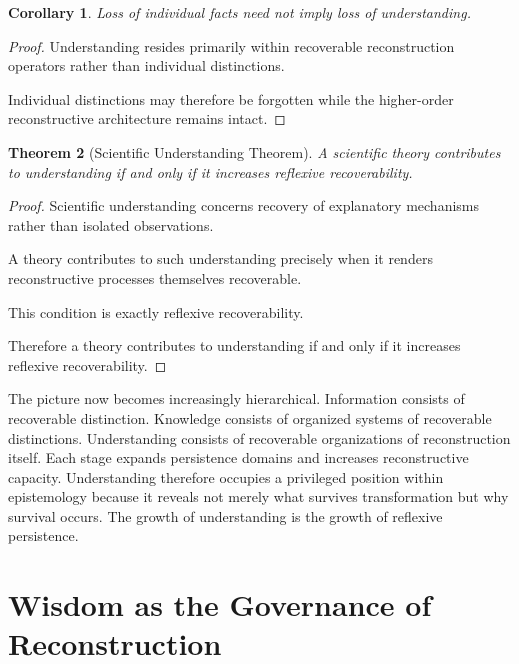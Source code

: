 \documentclass[12pt,oneside]{article}
\newtheorem{theorem}{Theorem}[section] \newtheorem{lemma}[theorem]{Lemma} \newtheorem{proposition}[theorem]{Proposition} \newtheorem{corollary}[theorem]{Corollary}
\theoremstyle{definition}
\begin{document}
\begin{corollary}

Loss of individual facts need not imply loss of understanding.

\end{corollary}

\begin{proof}

Understanding resides primarily within recoverable reconstruction operators rather than individual distinctions.

Individual distinctions may therefore be forgotten while the higher-order reconstructive architecture remains intact.

\end{proof}

\begin{theorem}[Scientific Understanding Theorem]

A scientific theory contributes to understanding if and only if it increases reflexive recoverability.

\end{theorem}

\begin{proof}

Scientific understanding concerns recovery of explanatory mechanisms rather than isolated observations.

A theory contributes to such understanding precisely when it renders reconstructive processes themselves recoverable.

This condition is exactly reflexive recoverability.

Therefore a theory contributes to understanding if and only if it increases reflexive recoverability.

\end{proof}

The picture now becomes increasingly hierarchical. Information consists of recoverable distinction. Knowledge consists of organized systems of recoverable distinctions. Understanding consists of recoverable organizations of reconstruction itself. Each stage expands persistence domains and increases reconstructive capacity. Understanding therefore occupies a privileged position within epistemology because it reveals not merely what survives transformation but why survival occurs. The growth of understanding is the growth of reflexive persistence.

\section{Wisdom as the Governance of Reconstruction}
\end{document}
